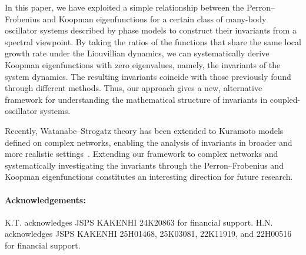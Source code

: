 \documentclass[
amsmath,amssymb,
]{revtex4-2}
\begin{document}
In this paper, we have exploited a simple relationship between the Perron--Frobenius and Koopman eigenfunctions for a certain class of many-body oscillator systems described by phase models to construct their invariants from a spectral viewpoint.
By taking the ratios of the functions that share the same local growth rate under the Liouvillian dynamics, we can systematically derive Koopman eigenfunctions with zero eigenvalues, namely, the invariants of the system dynamics.
%
The resulting invariants coincide with those previously found through different methods. Thus, our approach gives a new, alternative framework for understanding the mathematical structure of invariants in coupled-oscillator systems.

Recently, Watanabe--Strogatz theory has been extended to Kuramoto models defined on complex networks, enabling the analysis of invariants in broader and more realistic settings~\cite{cestnik2024integrability}.
Extending our framework to complex networks and systematically investigating the invariants through the Perron--Frobenius and Koopman eigenfunctions constitutes an interesting direction for future research.

\paragraph*{Acknowledgements:}
 K.T. acknowledges JSPS KAKENHI 24K20863 for financial support. H.N. acknowledges JSPS KAKENHI 25H01468, 25K03081, 22K11919, and 22H00516 for financial support.
\end{document}
